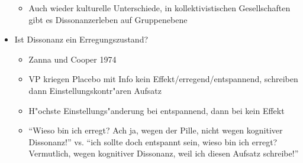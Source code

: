 \begin{itemize}
\begin{itemize}
					\item
						Auch wieder kulturelle Unterschiede, in kollektivistischen Gesellschaften gibt es Dissonanzerleben auf Gruppenebene
				\end{itemize}
			\item
				Ist Dissonanz ein Erregungszustand?
				\begin{itemize}
					\item
						Zanna und Cooper 1974
					\item
						VP kriegen Placebo mit Info kein Effekt/erregend/entspannend, schreiben dann Einstellungskontr"aren Aufsatz
					\item
						H"ochste Einstellungs"anderung bei entspannend, dann bei kein Effekt
					\item
						\enquote{Wieso bin ich erregt? Ach ja, wegen der Pille, nicht wegen kognitiver Dissonanz!} vs. \enquote{ich sollte doch entspannt sein, wieso bin ich erregt? Vermutlich, wegen kognitiver Dissonanz, weil ich diesen Aufsatz schreibe!}
				\end{itemize}
\end{itemize}
